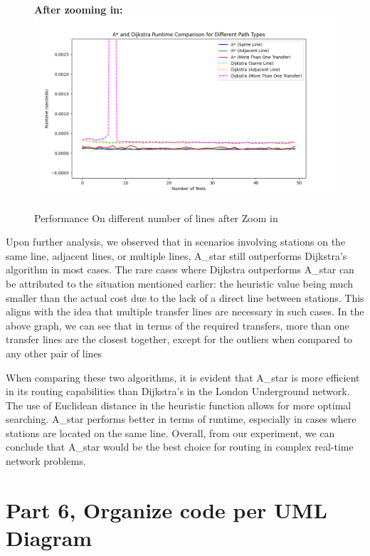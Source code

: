 \documentclass{article}
\begin{document}
\begin{onehalfspace}
\begin{figure}[H]  
\centering
\textbf{After zooming in:}
\includegraphics[width=\textwidth]{part5_graph7.png}
\caption{Performance On different number of lines after Zoom in}
\end{figure}


Upon further analysis, we observed that in scenarios involving stations on the same line, adjacent lines, or multiple lines, A\_star still outperforms Dijkstra’s algorithm in most cases. The rare cases where Dijkstra outperforms A\_star can be attributed to the situation mentioned earlier: the heuristic value being much smaller than the actual cost due to the lack of a direct line between stations. This aligns with the idea that multiple transfer lines are necessary in such cases. In the above graph, we can see that in terms of the required transfers, more than one transfer lines are the closest together, except for the outliers when compared to any other pair of lines

When comparing these two algorithms, it is evident that A\_star is more efficient in its routing capabilities than Dijkstra’s in the London Underground network. The use of Euclidean distance in the heuristic function allows for more optimal searching. A\_star performs better in terms of runtime, especially in cases where stations are located on the same line. Overall, from our experiment, we can conclude that A\_star would be the best choice for routing in complex real-time network problems.

\newpage

\section*{Part 6, Organize code per UML Diagram}


\end{onehalfspace}
\end{document}
